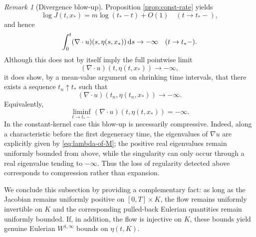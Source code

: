 \documentclass[11pt]{amsart}
\numberwithin{equation}{section}
\theoremstyle{definition}
\theoremstyle{remark}
\newtheorem{remark}[theorem]{Remark}
\numberwithin{equation}{section}
\newtheorem{remark}[theorem]{Remark}
\newcommand{\ds}{\textnormal{d}s}
\begin{document}
\begin{remark}[Divergence blow-up]
Proposition \ref{prop:const-rate} yields
\[
\log J(t,x_*) = m\log(t_*-t)+O(1)\quad (t\to t_*-),
\]
and hence
\[
\int_0^t (\nabla\cdot u)(s,\eta(s,x_*))\,\ds \to -\infty
\quad (t\to t_*-).
\]
Although this does not by itself imply the full pointwise limit
\[
(\nabla\cdot u)(t,\eta(t,x_*))\to -\infty,
\]
it does show, by a mean-value argument on shrinking time intervals, that there exists a sequence $t_n\uparrow t_*$ such that
\[
(\nabla\cdot u)(t_n,\eta(t_n,x_*))\to -\infty.
\]
Equivalently,
\[
\liminf_{t\to t_*-}(\nabla\cdot u)(t,\eta(t,x_*))=-\infty.
\]
In the constant-kernel case this blow-up is necessarily compressive. Indeed, along a characteristic before the first degeneracy time, the eigenvalues of $\nabla u$ are explicitly given by \eqref{eq:lambda-of-M}; the positive real eigenvalues remain uniformly bounded from above, while the singularity can only occur through a real eigenvalue tending to $-\infty$. Thus the loss of regularity detected above corresponds to compression rather than expansion.
\end{remark}
 
  
We conclude this subsection by providing a complementary fact: as long as the Jacobian remains uniformly positive on $[0,T]\times K$, the flow remains uniformly invertible on $K$ and  the corresponding pulled-back Eulerian quantities remain uniformly bounded. If, in addition, the flow is injective on $K$, these bounds yield genuine Eulerian $W^{1,\infty}$ bounds on $\eta(t,K)$.
\end{document}
